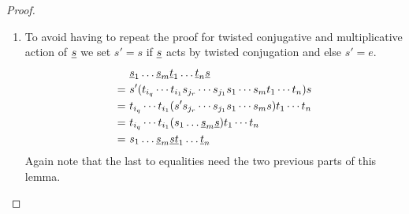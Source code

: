 \begin{lemm}
\begin{proof}
\begin{enumerate}
			\item To avoid having to repeat the proof for twisted conjugative and multiplicative action of $\underline{s}$ we set $s' = s$ if $\underline{s}$ acts by twisted conjugation and else $s' = e$.
			\begin{align*}
					& \ul s_1 \ldots \ul s_m \ul t_1 \ldots \ul t_n \ul s \\
				= \	& s' (t_{i_q} \cdots t_{i_1} s_{j_r} \cdots s_{j_1} s_1 \cdots s_m t_1 \cdots t_n) s \\
				= \	& t_{i_q} \cdots t_{i_1} (s' s_{j_r} \cdots s_{j_1} s_1 \cdots s_m s) t_1 \cdots t_n \\
				= \	& t_{i_q} \cdots t_{i_1} (s_1 \ldots \ul s_m \ul s) t_1 \cdots t_n \\
				= \	& s_1 \ldots \ul s_m \ul s \ul t_1 \ldots \ul t_n
			\end{align*}
			Again note that the last to equalities need the two previous parts of this lemma. \qedhere
		\end{enumerate}
	\end{proof}
\end{lemm}